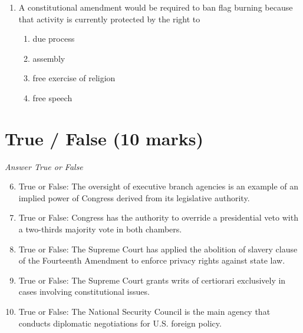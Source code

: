 \documentclass[12pt]{article}
\begin{document}
\begin{enumerate}[label=\arabic*.]
\begin{enumerate}[label=(\alph*)]
    \item A new democratic internationalism led by the United States
    \item A new balance of power between the US and China
    \item A new global economic framework
    \item A new era of globalization
\end{enumerate}
\item A constitutional amendment would be required to ban flag burning because that activity is currently protected by the right to
\begin{enumerate}[label=(\alph*)]
    \item due process
    \item assembly
    \item free exercise of religion
    \item free speech
\end{enumerate}
\end{enumerate}

\section*{True / False (10 marks)}
\textit{Answer True or False}
\begin{enumerate}[label=\arabic*.]
\setcounter{enumi}{5}
\item True or False: The oversight of executive branch agencies is an example of an implied power of Congress derived from its legislative authority.
\item True or False: Congress has the authority to override a presidential veto with a two-thirds majority vote in both chambers.
\item True or False: The Supreme Court has applied the abolition of slavery clause of the Fourteenth Amendment to enforce privacy rights against state law.
\item True or False: The Supreme Court grants writs of certiorari exclusively in cases involving constitutional issues.
\item True or False: The National Security Council is the main agency that conducts diplomatic negotiations for U.S. foreign policy.
\end{enumerate}
\end{document}
